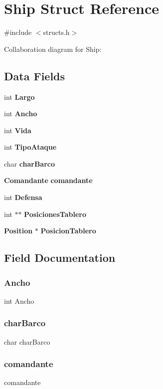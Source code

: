 \section{Ship Struct Reference}
\label{struct_ship}


{\ttfamily \#include $<$structs.\+h$>$}



Collaboration diagram for Ship\+:
\subsection*{Data Fields}
\begin{DoxyCompactItemize}
\item 
int {\bf Largo}
\item 
int {\bf Ancho}
\item 
int {\bf Vida}
\item 
int {\bf Tipo\+Ataque}
\item 
char {\bf char\+Barco}
\item 
{\bf Comandante} {\bf comandante}
\item 
int {\bf Defensa}
\item 
int $\ast$$\ast$ {\bf Posiciones\+Tablero}
\item 
{\bf Position} $\ast$ {\bf Posicion\+Tablero}
\end{DoxyCompactItemize}


\subsection{Field Documentation}
\label{struct_ship_ab15bf34d1cb7004823197e308b1277bb} 
\subsubsection{Ancho}
{\footnotesize\ttfamily int Ancho}

\label{struct_ship_a503bbde9d1d5ec12340431e1d01b6c0e} 
\subsubsection{char\+Barco}
{\footnotesize\ttfamily char char\+Barco}

\label{struct_ship_aa19f185a0eb2ff531575ce56e7339dd4} 
\subsubsection{comandante}
{\footnotesize{} comandante}

